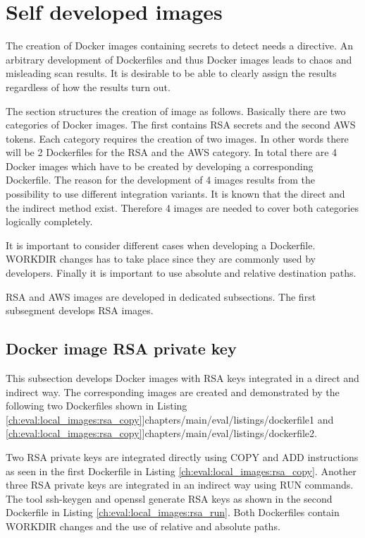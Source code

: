 \section{Self developed images}
\label{ch:eval:local_images}
The creation of Docker images containing secrets to detect needs a directive. 
An arbitrary development of Dockerfiles and thus Docker images leads to chaos and misleading scan results. 
It is desirable to be able to clearly assign the results regardless of how the results turn out.

The section structures the creation of image as follows. 
Basically there are two categories of Docker images. 
The first contains RSA secrets and the second AWS tokens. 
Each category requires the creation of two images. 
In other words there will be 2 Dockerfiles for the RSA and the AWS category. 
In total there are 4 Docker images which have to be created by developing a corresponding Dockerfile. 
The reason for the development of 4 images results from the possibility to use different integration variants.
It is known that the direct and the indirect method exist. 
Therefore 4 images are needed to cover both categories logically completely.

It is important to consider different cases when developing a Dockerfile. 
WORKDIR changes has to take place since they are commonly used by developers. 
Finally it is important to use absolute and relative destination paths. 

RSA and AWS images are developed in dedicated subsections. 
The first subsegment develops RSA images.

\subsection{Docker image RSA private key}
\label{ch:eval:local_images:rsa}
This subsection develops Docker images with RSA keys integrated in a direct and indirect way. 
The corresponding images are created and demonstrated by the following two Dockerfiles shown in Listing \ref{ch:eval:local_images:rsa_copy}]{chapters/main/eval/listings/dockerfile1} and \ref{ch:eval:local_images:rsa_copy}]{chapters/main/eval/listings/dockerfile2}.


Two RSA private keys are integrated directly using COPY and ADD instructions as seen in the first Dockerfile in Listing \ref{ch:eval:local_images:rsa_copy}. 
Another three RSA private keys are integrated in an indirect way using RUN commands. 
The tool ssh-keygen and openssl generate RSA keys as shown in the second Dockerfile in Listing \ref{ch:eval:local_images:rsa_run}. 
Both Dockerfiles contain WORKDIR changes and the use of relative and absolute paths. 

